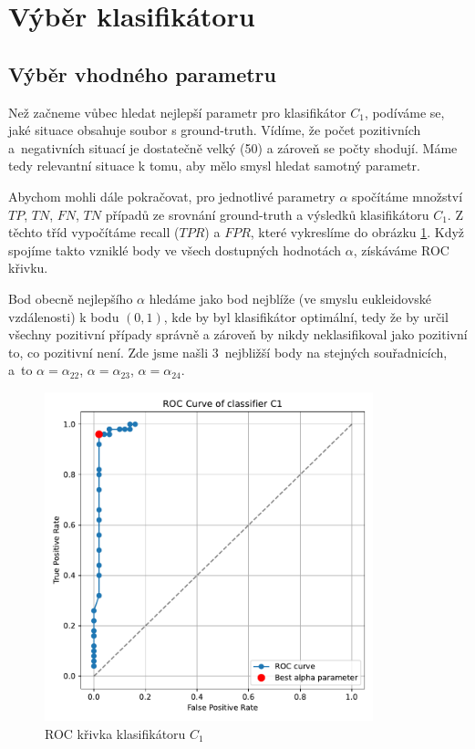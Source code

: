 \documentclass[a4paper,12pt]{article}
\begin{document}
\section*{Výběr klasifikátoru}
\renewcommand{\thesubsection}{\arabic{subsection}.}

\subsection{Výběr vhodného parametru}
Než začneme vůbec hledat nejlepší parametr pro klasifikátor $C_1$, podíváme se, jaké situace obsahuje soubor s ground-truth. Vídíme, že počet pozitivních a~negativních situací je dostatečně velký (50) a zároveň se počty shodují. Máme tedy relevantní situace k tomu, aby mělo smysl hledat samotný parametr. 

Abychom mohli dále pokračovat, pro jednotlivé parametry $\alpha$ spočítáme množství $TP$, $TN$, $FN$, $TN$ případů ze srovnání ground-truth a výsledků klasifikátoru $C_1$. Z těchto tříd vypočítáme recall ($TPR$) a $FPR$, které vykreslíme do obrázku \ref{fig:roc_curve}. Když spojíme takto vzniklé body ve všech dostupných hodnotách $\alpha$, získáváme ROC křivku. 

Bod obecně nejlepšího $\alpha$ hledáme jako bod nejblíže (ve smyslu eukleidovské vzdálenosti) k bodu $(0,1)$, kde by byl klasifikátor optimální, tedy že by určil všechny pozitivní případy správně a zároveň by nikdy neklasifikoval jako pozitivní to, co pozitivní není. Zde jsme našli $3$~nejbližší body na stejných souřadnicích, a~to $\alpha = \alpha_{22}$, $\alpha = \alpha_{23}$, $\alpha = \alpha_{24}$.

\begin{figure}[H]
    \centering
    \includegraphics[width=0.85\textwidth]{roc.pdf}
    \caption{ROC křivka klasifikátoru $C_1$}
    \label{fig:roc_curve}
\end{figure}
\end{document}
